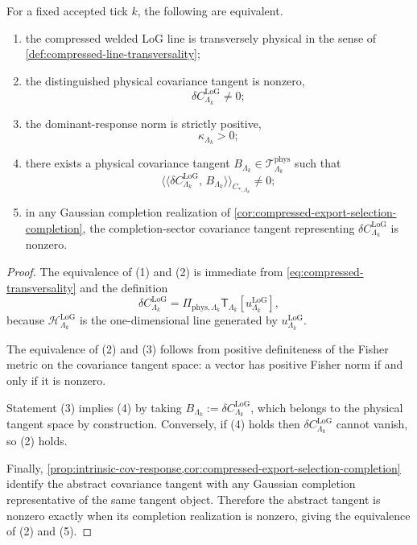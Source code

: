 \documentclass[11pt]{article}
\begin{document}
\begin{proposition}
\label{prop:dominant-line-equivalent}
For a fixed accepted tick \(k\), the following are equivalent.
\begin{enumerate}[leftmargin=2em]
\item the compressed welded LoG line is transversely physical in the sense of
  \cref{def:compressed-line-transversality};
\item the distinguished physical covariance tangent is nonzero,
  \[
  \delta C^{\mathrm{LoG}}_{\Lambda_k}\neq 0;
  \]
\item the dominant-response norm is strictly positive,
  \[
  \kappa_{\Lambda_k}>0;
  \]
\item there exists a physical covariance tangent
  \(
  B_{\Lambda_k}\in \mathcal T^{\mathrm{phys}}_{\Lambda_k}
  \)
  such that
  \[
  \big\langle\!\big\langle
  \delta C^{\mathrm{LoG}}_{\Lambda_k},\,B_{\Lambda_k}
  \big\rangle\!\big\rangle_{C_{\ast,\Lambda_k}}
  \neq 0;
  \]
\item in any Gaussian completion realization of
  \cref{cor:compressed-export-selection-completion}, the completion-sector covariance tangent
  representing \(\delta C^{\mathrm{LoG}}_{\Lambda_k}\) is nonzero.
\end{enumerate}
\end{proposition}

\begin{proof}
The equivalence of (1) and (2) is immediate from
\eqref{eq:compressed-transversality} and the definition
\[
\delta C^{\mathrm{LoG}}_{\Lambda_k}
=
\Pi_{\mathrm{phys},\Lambda_k}\mathsf T_{\Lambda_k}[u^{\mathrm{LoG}}_{\Lambda_k}],
\]
because \(\mathcal H^{\mathrm{LoG}}_{\Lambda_k}\) is the one-dimensional line generated by
\(u^{\mathrm{LoG}}_{\Lambda_k}\).

The equivalence of (2) and (3) follows from positive definiteness of the Fisher metric on the
covariance tangent space: a vector has positive Fisher norm if and only if it is nonzero.

Statement (3) implies (4) by taking
\(
B_{\Lambda_k}:=\delta C^{\mathrm{LoG}}_{\Lambda_k}
\),
which belongs to the physical tangent space by construction.
Conversely, if (4) holds then \(\delta C^{\mathrm{LoG}}_{\Lambda_k}\) cannot vanish, so (2) holds.

Finally, \cref{prop:intrinsic-cov-response,cor:compressed-export-selection-completion} identify the
abstract covariance tangent with any Gaussian completion representative of the same tangent object.
Therefore the abstract tangent is nonzero exactly when its completion realization is nonzero, giving
the equivalence of (2) and (5).
\end{proof}
\end{document}
